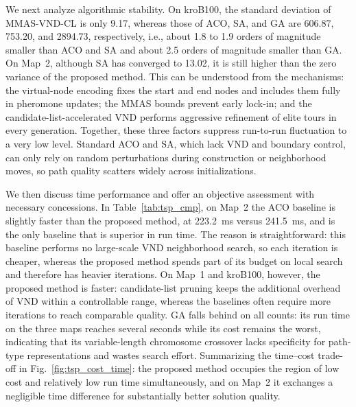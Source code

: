 \documentclass[pdflatex,sn-basic,Numbered]{sn-jnl}
\begin{document}
We next analyze algorithmic stability. On kroB100, the standard deviation of MMAS-VND-CL is only 9.17, whereas those of ACO, SA, and GA are 606.87, 753.20, and 2894.73, respectively, i.e., about 1.8 to 1.9 orders of magnitude smaller than ACO and SA and about 2.5 orders of magnitude smaller than GA. On Map~2, although SA has converged to 13.02, it is still higher than the zero variance of the proposed method. This can be understood from the mechanisms: the virtual-node encoding fixes the start and end nodes and includes them fully in pheromone updates; the MMAS bounds prevent early lock-in; and the candidate-list-accelerated VND performs aggressive refinement of elite tours in every generation. Together, these three factors suppress run-to-run fluctuation to a very low level. Standard ACO and SA, which lack VND and boundary control, can only rely on random perturbations during construction or neighborhood moves, so path quality scatters widely across initializations.

We then discuss time performance and offer an objective assessment with necessary concessions. In Table~\ref{tab:tsp_cmp}, on Map~2 the ACO baseline is slightly faster than the proposed method, at 223.2~ms versus 241.5~ms, and is the only baseline that is superior in run time. The reason is straightforward: this baseline performs no large-scale VND neighborhood search, so each iteration is cheaper, whereas the proposed method spends part of its budget on local search and therefore has heavier iterations. On Map~1 and kroB100, however, the proposed method is faster: candidate-list pruning keeps the additional overhead of VND within a controllable range, whereas the baselines often require more iterations to reach comparable quality. GA falls behind on all counts: its run time on the three maps reaches several seconds while its cost remains the worst, indicating that its variable-length chromosome crossover lacks specificity for path-type representations and wastes search effort. Summarizing the time--cost trade-off in Fig.~\ref{fig:tsp_cost_time}: the proposed method occupies the region of low cost and relatively low run time simultaneously, and on Map~2 it exchanges a negligible time difference for substantially better solution quality.
\end{document}
